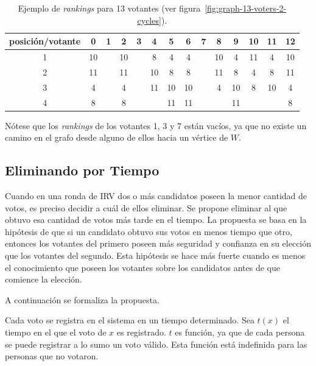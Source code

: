 \begin{table}[h!]
    \centering
    \begin{tabular}{|c|c|c|c|c|c|c|c|c|c|c|c|c|c|}
        \hline
        posici\'on/votante & 0  & 1  & 2  & 3  & 4  & 5  & 6  & 7  & 8  & 9  & 10 & 11 & 12 \\ \hline
        1                  & 10 &    & 10 &    & 8  & 4  & 4  &    & 10 & 4  & 11 & 4  & 10 \\ \hline
        2                  & 11 &    & 11 &    & 10 & 8  & 8  &    & 11 & 8  & 4  & 8  & 11 \\ \hline
        3                  & 4  &    & 4  &    & 11 & 10 & 10 &    & 4  & 10 & 8  & 10 & 4  \\ \hline
        4                  & 8  &    & 8  &    &    & 11 & 11 &    &    & 11 &    &    & 8  \\ \hline
    \end{tabular}
    \caption{Ejemplo de \textit{rankings} para 13 votantes (ver figura~\ref{fig:graph-13-voters-2-cycles}).}
    \label{tab:rankings-13-voters}
\end{table}

N\'otese que los \textit{rankings}  de los votantes 1, 3 y 7 est\'an vac\'ios, ya que no existe un camino en el grafo desde alguno de ellos hacia un v\'ertice de $W$.

\subsection{Eliminando por Tiempo}
Cuando en una ronda de IRV dos o m\'as candidatos poseen la menor cantidad de votos, es preciso decidir a cu\'al de ellos eliminar. Se propone eliminar al que obtuvo esa cantidad de votos m\'as tarde en el tiempo. La propuesta se basa en la hip\'otesis de que si un candidato obtuvo sus votos en menos tiempo que otro, entonces los votantes del primero poseen m\'as seguridad y confianza en su elecci\'on que los votantes del segundo. Esta hip\'otesis se hace m\'as fuerte cuando es menos el conocimiento que poseen los votantes sobre los candidatos antes de que comience la elecci\'on. 

A continuaci\'on se formaliza la propuesta.


Cada voto se registra en el sistema en un tiempo determinado. Sea $t(x)$ el tiempo en el que el voto de $x$ es registrado. $t$ es funci\'on, ya que de cada persona se puede registrar a lo sumo un voto v\'alido. Esta funci\'on est\'a indefinida para las personas que no votaron.

